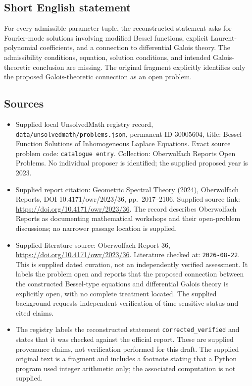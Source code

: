 \documentclass[11pt]{article}
\begin{document}
\subsection{Short English statement}
For every admissible parameter tuple, the reconstructed statement asks for Fourier-mode solutions involving modified Bessel functions, explicit Laurent-polynomial coefficients, and a connection to differential Galois theory. The admissibility conditions, equation, solution conditions, and intended Galois-theoretic conclusion are missing. The original fragment explicitly identifies only the proposed Galois-theoretic connection as an open problem.
\subsection{Sources}
\begin{itemize}
\item Supplied local UnsolvedMath registry record, \texttt{data/unsolvedmath/problems.json}, permanent ID \(30005604\), title: Bessel-Function Solutions of Inhomogeneous Laplace Equations. Exact source problem code: \texttt{catalogue entry}. Collection: Oberwolfach Reports Open Problems. No individual proposer is identified; the supplied proposed year is 2023.
\item Supplied report citation: Geometric Spectral Theory (2024), Oberwolfach Reports, DOI 10.4171/owr/2023/36, pp.\ 2017--2106. Supplied source link: \url{https://doi.org/10.4171/owr/2023/36}. The record describes Oberwolfach Reports as documenting mathematical workshops and their open-problem discussions; no narrower passage location is supplied.
\item Supplied literature source: Oberwolfach Report 36, \url{https://doi.org/10.4171/owr/2023/36}. Literature checked at: \texttt{2026-08-22}. This is supplied dated curation, not an independently verified assessment. It labels the problem open and reports that the proposed connection between the constructed Bessel-type equations and differential Galois theory is explicitly open, with no complete treatment located. The supplied background requests independent verification of time-sensitive status and cited claims.
\item The registry labels the reconstructed statement \texttt{corrected\_verified} and states that it was checked against the official report. These are supplied provenance claims, not verification performed for this draft. The supplied original text is a fragment and includes a footnote stating that a Python program used integer arithmetic only; the associated computation is not supplied.
\end{itemize}
\end{document}
